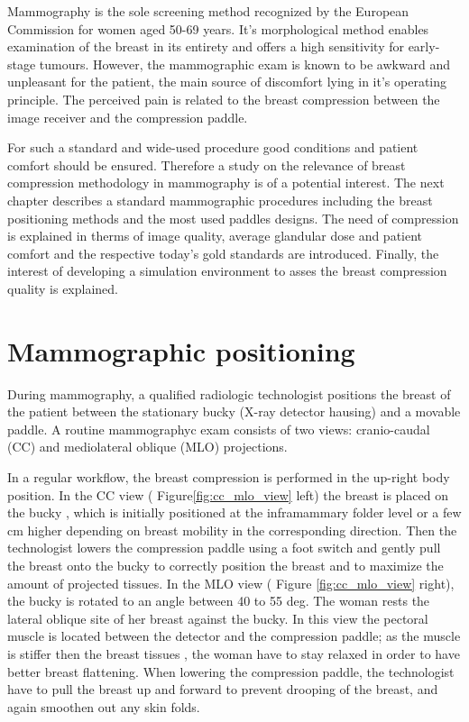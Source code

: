 

Mammography is the sole screening method recognized by the European Commission for women aged 50-69 years. It's morphological method enables examination of the breast in its entirety and offers a high sensitivity for early-stage tumours. However, the mammographic exam is known to be awkward and  unpleasant for the patient,  the main source of discomfort lying in it's operating principle. The perceived pain is related to the breast compression between the image receiver and the compression paddle.

For such a standard and wide-used procedure good conditions and patient comfort should be ensured. Therefore a study on the relevance of breast compression methodology in mammography is of a potential interest. The next chapter describes a standard mammographic procedures including the breast positioning methods and the most used paddles designs. The need of compression is explained in therms of  image quality, average glandular dose and patient comfort and the respective today's gold standards are introduced. Finally, the  interest of developing a simulation environment to asses the breast compression quality is explained.

\clearpage
\section{Mammographic positioning} \label{subsec:mammographicpositioning}

During mammography, a qualified radiologic technologist positions the breast of the patient between the stationary bucky (X-ray detector hausing) and a movable paddle. A routine mammographyc exam consists of two views: cranio-caudal (CC) and mediolateral oblique (MLO) projections.  

In a regular workflow, the breast compression is performed in the up-right body position. In the CC view ( Figure\ref{fig:cc_mlo_view} left) the breast is placed on the bucky , which is initially positioned at the inframammary folder level or a few cm higher depending on breast mobility in the corresponding direction. Then the technologist lowers the compression paddle using a foot switch and gently pull the breast onto the bucky to correctly position the breast and to maximize the amount of projected tissues. In the MLO view ( Figure \ref{fig:cc_mlo_view} right), the bucky is rotated to an angle between 40 to 55 deg. The woman rests the lateral oblique site of her breast against the bucky. In this view the pectoral muscle is located between the detector and the compression paddle; as the muscle is stiffer then the breast tissues , the woman have to stay relaxed in order to have better breast flattening. When lowering the compression paddle, the technologist have to pull the breast up and forward to prevent drooping of the breast, and again smoothen out any skin folds. 



